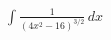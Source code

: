 \documentclass[preview]{standalone}
\begin{document}
\begin{align*}
\int \frac{1}{(4x^2-16)^{3/2}} \, dx
\end{align*}
\end{document}
